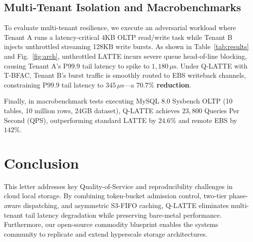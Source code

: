 \documentclass[lettersize,journal]{IEEEtran}
\begin{document}
\subsection{Multi-Tenant Isolation and Macrobenchmarks}
To evaluate multi-tenant resilience, we execute an adversarial workload where Tenant A runs a latency-critical 4KB OLTP read/write task while Tenant B injects unthrottled streaming 128KB write bursts.
As shown in Table~\ref{tab:results} and Fig.~\ref{fig:arch}, unthrottled LATTE incurs severe queue head-of-line blocking, causing Tenant A's P99.9 tail latency to spike to $1,180\,\mu\text{s}$. Under Q-LATTE with T-BFAC, Tenant B's burst traffic is smoothly routed to EBS writeback channels, constraining P99.9 tail latency to $345\,\mu\text{s}$—a \textbf{$70.7\%$ reduction}.

Finally, in macrobenchmark tests executing MySQL 8.0 Sysbench OLTP (10 tables, 10 million rows, 24GB dataset), Q-LATTE achieves $23,800$ Queries Per Second (QPS), outperforming standard LATTE by $24.6\%$ and remote EBS by $142\%$.

\section{Conclusion}
This letter addresses key Quality-of-Service and reproducibility challenges in cloud local storage. By combining token-bucket admission control, two-tier phase-aware dispatching, and asymmetric S3-FIFO caching, Q-LATTE eliminates multi-tenant tail latency degradation while preserving bare-metal performance. Furthermore, our open-source commodity blueprint enables the systems community to replicate and extend hyperscale storage architectures.
\end{document}
